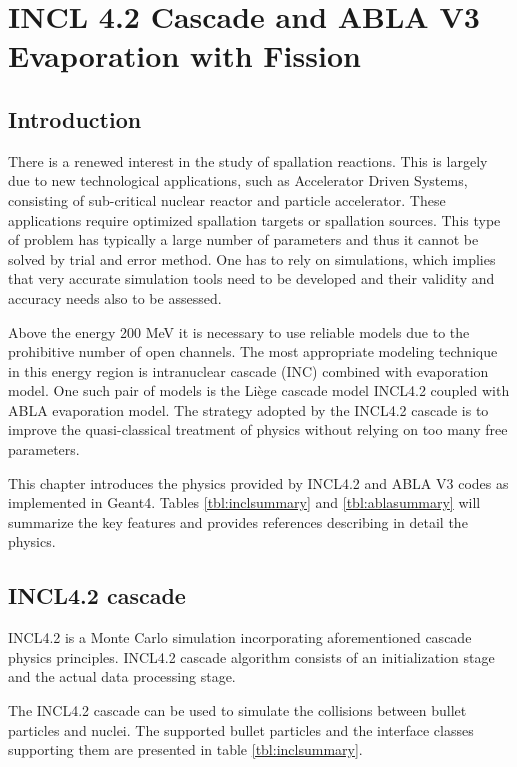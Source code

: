 \chapter{INCL 4.2 Cascade and ABLA V3 Evaporation with Fission}

\section{Introduction}

There is a renewed interest in the study of spallation reactions. This
is largely due to new technological applications, such as Accelerator
Driven Systems, consisting of sub-critical nuclear reactor and
particle accelerator. These applications require optimized spallation
targets or spallation sources. This type of problem has typically a large number
of parameters and thus it cannot be solved by trial and error
method. One has to rely on simulations, which implies that very
accurate simulation tools need to be developed and their validity and
accuracy needs also to be assessed.

Above the energy 200 MeV it is necessary to use reliable models due to
the prohibitive number of open channels. The most appropriate modeling
technique in this energy region is intranuclear cascade (INC) combined
with evaporation model. One such pair of models is the Li\`ege cascade
model INCL4.2 coupled with ABLA evaporation model. The strategy adopted
by the INCL4.2 cascade is to improve the quasi-classical treatment of
physics without relying on too many free parameters. 

This chapter introduces the physics provided by INCL4.2 and ABLA V3 codes as implemented in Geant4.
Tables \ref{tbl:inclsummary} and \ref{tbl:ablasummary} will summarize the key features 
and provides references describing in detail the physics.


\section{INCL4.2 cascade} 
\label{sec:inclmodel}

INCL4.2 is a Monte Carlo simulation incorporating aforementioned cascade
physics principles. INCL4.2 cascade algorithm consists of an
initialization stage and the actual data processing stage.


The INCL4.2 cascade can be used to simulate the collisions between
bullet particles and nuclei. The supported bullet particles and the
interface classes supporting them are presented in table
\ref{tbl:inclsummary}.



